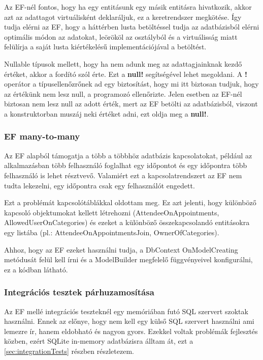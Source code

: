 Az EF-nél fontos, hogy ha egy entitásunk egy másik entitásra hivatkozik, akkor azt az adattagot virtuálisként deklaráljuk, ez a keretrendszer megkötése. Így tudja elérni az EF, hogy a háttérben lusta betöltéssel tudja az adatbázisból elérni optimális módon az adatokat, leörököl az osztályból és a virtuálisság miatt felülírja a saját lusta kiértékelésű implementációjával a betöltést.

Nullable típusok mellett, hogy ha nem adunk meg az adattagjainknak kezdő értéket, akkor a fordító szól érte. Ezt a \textbf{null!} segítségével lehet megoldani. A \textbf{!} operátor a típusellenőzrőnek ad egy biztosítást, hogy mi itt biztosan tudjuk, hogy az értékünk nem lesz null, a programozó ellenőrizte. Jelen esetben az EF-nél biztosan nem lesz null az adott érték, mert az EF betölti az adatbázisból, viszont a konstruktorban muszáj neki értéket adni, ezt oldja meg a \textbf{null!}.

\subsubsection{EF many-to-many}

Az EF alapból támogatja a több a többhöz adatbázis kapcsolatokat, például az alkalmazásban több felhasználó foglalhat egy időpontot és egy időpontra több felhasználó is lehet résztvevő. Valamiért ezt a kapcsolatrendszert az EF nem tudta lekezelni, egy időpontra csak egy felhasználót engedett.

Ezt a problémát kapcsolótáblákkal oldottam meg. Ez azt jelenti, hogy különböző kapcsoló objektumokat kellett létrehozni (AttendeeOnAppointments, AllowedUserOnCategories) és ezeket a különböző összekapcsolandó entitásokra egy listába (pl.: AttendeeOnAppointmentsJoin, OwnerOfCategories).

Ahhoz, hogy az EF ezeket használni tudja, a DbContext OnModelCreating metódusát felül kell írni és a ModelBuilder megfelelő függvényeivel konfigurálni, ez a kódban látható.

\subsubsection{Integrációs tesztek párhuzamosítása}

Az EF mellé integrációs teszteknél egy memóriában futó SQL szervert szoktak használni. Ennek az előnye, hogy nem kell egy külső SQL szervert használni ami lemezre ír, hanem eldobható és nagyon gyors. Ezekkel voltak problémák fejlesztés közben, ezért SQLite in-memory adatbázisra álltam át, ezt a \ref{sec:integrationTests} részben részletezem.

